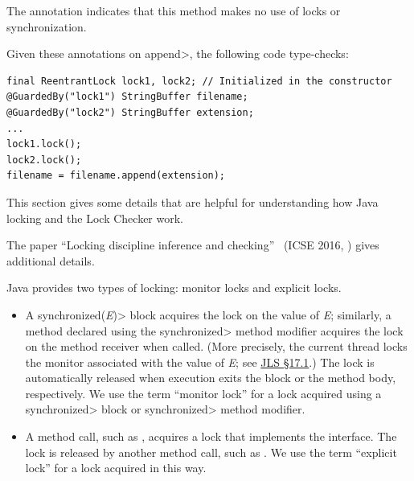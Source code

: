 The  annotation indicates that
this method makes no use of
locks or synchronization.

Given these annotations on \<append>, the following code type-checks:

\begin{verbatim}
final ReentrantLock lock1, lock2; // Initialized in the constructor
@GuardedBy("lock1") StringBuffer filename;
@GuardedBy("lock2") StringBuffer extension;
...
lock1.lock();
lock2.lock();
filename = filename.append(extension);
\end{verbatim}





This section gives some details that are helpful for understanding how Java
locking and the Lock Checker work.

The paper ``Locking discipline inference and checking''~\cite{ErnstLMST2016} (ICSE 2016,
)
gives additional details.



Java provides two types of locking:  monitor locks and explicit locks.

\begin{itemize}
\item
  A \<synchronized(\emph{E})> block acquires the lock on the value of
  \emph{E}; similarly, a method declared using the \<synchronized> method
  modifier acquires the lock on the method receiver when called.
  (More precisely,
  the current thread locks the monitor associated with the value of
  \emph{E}; see \href{https://docs.oracle.com/javase/specs/jls/se25/html/jls-17.html#jls-17.1}{JLS \S17.1}.)
  The lock is automatically released when execution exits the block or the
  method body, respectively.
  We use the term ``monitor lock'' for a lock acquired using a
  \<synchronized> block or \<synchronized> method modifier.
\item A method call, such as
  ,
  acquires a lock that implements the
  interface.
  The lock is released by another method call, such as
  .
  We use the term ``explicit lock'' for a lock acquired in this
  way.
\end{itemize}

